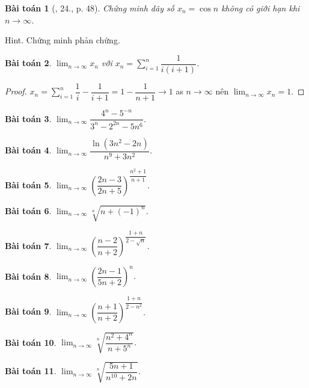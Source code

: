 \documentclass[oneside]{book}
\newtheorem{baitoan}{Bài toán}
\begin{document}
\begin{baitoan}[\cite{TLCT_BT_dai_so_giai_tich_11}, 24., p. 48]
	Chứng minh dãy số $x_n = \cos n$ không có giới hạn khi $n\to\infty$.
\end{baitoan}
{\sf Hint.} Chứng minh phản chứng.

\begin{baitoan}
	$\lim_{n\to\infty} x_n$ với $x_n = \sum_{i=1}^n \dfrac{1}{i(i + 1)}$.
\end{baitoan}

\begin{proof}
	$x_n = \sum_{i=1}^n \dfrac{1}{i} - \dfrac{1}{i + 1} = 1 - \dfrac{1}{n + 1}\to1$ as $n\to\infty$ nên $\lim_{n\to\infty} x_n = 1$.
\end{proof}

\begin{baitoan}
	$\lim_{n\to\infty} \dfrac{4^n - 5^{-n}}{3^n - 2^{2n} - 5n^6}$.
\end{baitoan}

\begin{baitoan}
	$\lim_{n\to\infty} \dfrac{\ln(3n^2 - 2n)}{n^9 + 3n^2}$.
\end{baitoan}

\begin{baitoan}
	$\lim_{n\to\infty} \left(\dfrac{2n - 3}{2n + 5}\right)^{\dfrac{n^2 + 1}{n + 1}}$.
\end{baitoan}

\begin{baitoan}
	$\lim_{n\to\infty} \sqrt[n]{n + (-1)^n}$.
\end{baitoan}

\begin{baitoan}
	$\lim_{n\to\infty} \left(\dfrac{n - 2}{n + 2}\right)^{\dfrac{1 + n}{2 - \sqrt{n}}}$.
\end{baitoan}

\begin{baitoan}
	$\lim_{n\to\infty} \left(\dfrac{2n - 1}{5n + 2}\right)^n$.
\end{baitoan}

\begin{baitoan}
	$\lim_{n\to\infty} \left(\dfrac{n + 1}{n + 2}\right)^{\dfrac{1 + n}{2 - n^2}}$.
\end{baitoan}

\begin{baitoan}
	$\lim_{n\to\infty} \sqrt[n]{\dfrac{n^2 + 4^n}{n + 5^n}}$.
\end{baitoan}

\begin{baitoan}
	$\lim_{n\to\infty} \sqrt[n]{\dfrac{5n + 1}{n^{10} + 2n}}$.
\end{baitoan}
\end{document}
